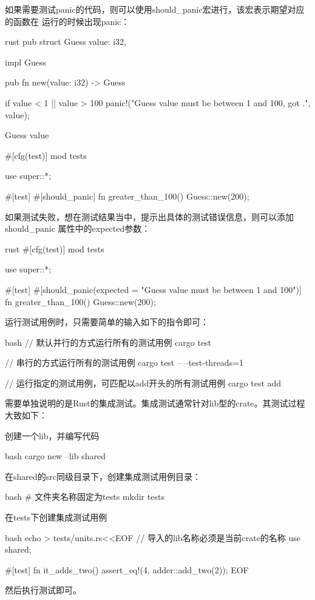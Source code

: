 如果需要测试panic的代码，则可以使用should\_panic宏进行，该宏表示期望对应的函数在
运行的时候出现panic：
\begin{code-block}{rust}
pub struct Guess {
    value: i32,
}

impl Guess {
    pub fn new(value: i32) -> Guess {
        if value < 1 || value > 100 {
            panic!("Guess value must be between 1 and 100, got {}.", value);
        }

        Guess {
            value
        }
    }
}

#[cfg(test)]
mod tests {
    use super::*;

    #[test]
    #[should_panic]
    fn greater_than_100() {
        Guess::new(200);
    }
}
\end{code-block}
如果测试失败，想在测试结果当中，提示出具体的测试错误信息，则可以添加should\_panic
属性中的expected参数：
\begin{code-block}{rust}
#[cfg(test)]
mod tests {
    use super::*;

    #[test]
    #[should_panic(expected = "Guess value must be between 1 and 100")]
    fn greater_than_100() {
        Guess::new(200);
    }
}
\end{code-block}

运行测试用例时，只需要简单的输入如下的指令即可：
\begin{code-block}{bash}
// 默认并行的方式运行所有的测试用例
cargo test

// 串行的方式运行所有的测试用例
cargo test -- --test-threads=1

// 运行指定的测试用例，可匹配以add开头的所有测试用例
cargo test add
\end{code-block}

需要单独说明的是Rust的集成测试。集成测试通常针对lib型的crate。其测试过程大致如下：
\begin{outline}[enumerate]
\1 创建一个lib，并编写代码

\begin{code-in-enumerate}{bash}
cargo new --lib shared
\end{code-in-enumerate}

\1 在shared的src同级目录下，创建集成测试用例目录：
\begin{code-in-enumerate}{bash}
# 文件夹名称固定为tests
mkdir tests
\end{code-in-enumerate}

\1 在tests下创建集成测试用例
\begin{code-in-enumerate}{bash}
echo > tests/units.rs<<EOF
// 导入的lib名称必须是当前crate的名称
use shared;

#[test]
fn it_adds_two() {
    assert_eq!(4, adder::add_two(2));
}
EOF
\end{code-in-enumerate}
然后执行测试即可。
\end{outline}

